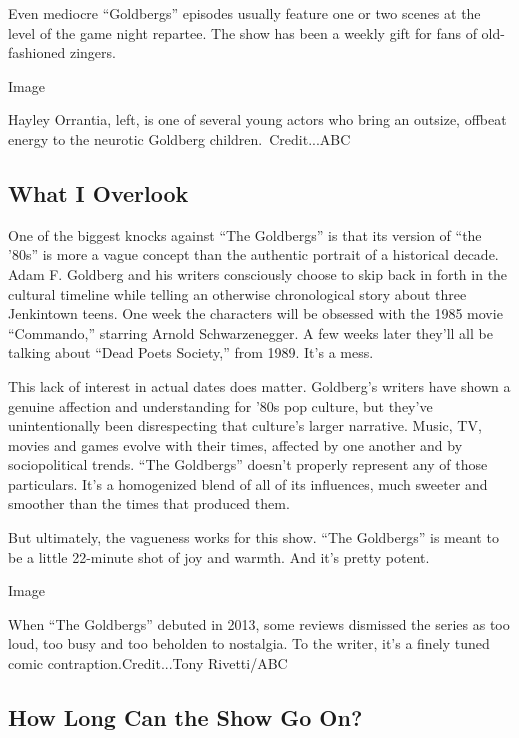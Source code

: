 Even mediocre ``Goldbergs'' episodes usually feature one or two scenes
at the level of the game night repartee. The show has been a weekly gift
for fans of old-fashioned zingers.

Image

Hayley Orrantia, left, is one of several young actors who bring an
outsize, offbeat energy to the neurotic Goldberg children.~Credit...ABC

\hypertarget{what-i-overlook}{%
\subsection{What I Overlook}\label{what-i-overlook}}

One of the biggest knocks against ``The Goldbergs'' is that its version
of ``the '80s'' is more a vague concept than the authentic portrait of a
historical decade. Adam F. Goldberg and his writers consciously choose
to skip back in forth in the cultural timeline while telling an
otherwise chronological story about three Jenkintown teens. One week the
characters will be obsessed with the 1985 movie ``Commando,'' starring
Arnold Schwarzenegger. A few weeks later they'll all be talking about
``Dead Poets Society,'' from 1989. It's a mess.

This lack of interest in actual dates does matter. Goldberg's writers
have shown a genuine affection and understanding for '80s pop culture,
but they've unintentionally been disrespecting that culture's larger
narrative. Music, TV, movies and games evolve with their times, affected
by one another and by sociopolitical trends. ``The Goldbergs'' doesn't
properly represent any of those particulars. It's a homogenized blend of
all of its influences, much sweeter and smoother than the times that
produced them.

But ultimately, the vagueness works for this show. ``The Goldbergs'' is
meant to be a little 22-minute shot of joy and warmth. And it's pretty
potent.

Image

When ``The Goldbergs'' debuted in 2013, some reviews dismissed the
series as too loud, too busy and too beholden to nostalgia. To the
writer, it's a finely tuned comic contraption.Credit...Tony Rivetti/ABC

\hypertarget{how-long-can-the-show-go-on}{%
\subsection{How Long Can the Show Go
On?}\label{how-long-can-the-show-go-on}}

